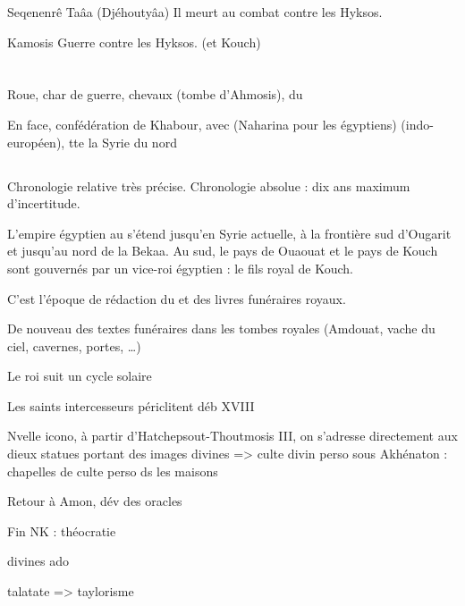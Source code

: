 \begin{listerois}
  \item [Seqenenrê Taâa (Djéhoutyâa)] Il meurt au combat contre 
        les Hyksos.
  \item [Kamosis] Guerre contre les Hyksos. (et Kouch)
\end{listerois}

\section{\NK}


Roue, char de guerre, chevaux (tombe d'Ahmosis), du \PO 

En face, confédération de Khabour, avec \Mtn (Naharina pour les 
égyptiens) (indo-européen), tte la Syrie du nord

\subsection{\texorpdfstring{}{XVIIIe dynastie}}

Chronologie relative très précise. Chronologie absolue : dix ans 
maximum d'incertitude.

L'empire égyptien au \PO s'étend jusqu'en Syrie actuelle, à la 
frontière sud d'Ougarit et jusqu'au nord de la Bekaa. 
Au sud, le pays de Ouaouat et le pays de Kouch sont gouvernés par un 
vice-roi égyptien : le fils royal de Kouch. 

C'est l'époque de rédaction du \LM et des livres funéraires royaux.

De nouveau des textes funéraires dans les tombes royales (Amdouat, 
vache du ciel, cavernes, portes, \dots)

Le roi suit un cycle solaire

Les saints intercesseurs périclitent déb XVIII

Nvelle icono, à partir d'Hatchepsout-Thoutmosis III, on s'adresse 
directement aux dieux
statues portant des images divines => \og culte divin perso \fg 
sous Akhénaton : chapelles de culte perso ds les maisons

Retour à Amon, dév des oracles

Fin NK : théocratie

divines ado

talatate => taylorisme

